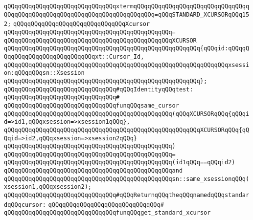 \verb|qQQqqQQqqQQqqQQqqQQqqQQqqQQqqQQqxtermqQQqqQQqqQQqqQQqqQQqqQQqqQQqqQQqqQQqqQQqqQQqqQQqqQQqqQQqqQQqqQQqqQQqqQQqqQQq=qQQqSTANDARD_XCURSORqQQq152;|\newline
\newline
\verb|qQQqqQQqqQQqqQQqqQQqqQQqqQQqqQQqXcursor|\newline
\verb|qQQqqQQqqQQqqQQqqQQqqQQqqQQqqQQqqQQqqQQqqQQqqQQq=|\newline
\verb|qQQqqQQqqQQqqQQqqQQqqQQqqQQqqQQqqQQqqQQqqQQqqQQqXCURSOR|\newline
\verb|qQQqqQQqqQQqqQQqqQQqqQQqqQQqqQQqqQQqqQQqqQQqqQQqqQQqqQQq{qQQqid:qQQqqQQqqQQqqQQqqQQqqQQqqQQqqQQqxt::Cursor_Id,|\newline
\verb|qQQqqQQqqQQqqQQqqQQqqQQqqQQqqQQqqQQqqQQqqQQqqQQqqQQqqQQqqQQqqQQqxsession:qQQqqQQqsn::Xsession|\newline
\verb|qQQqqQQqqQQqqQQqqQQqqQQqqQQqqQQqqQQqqQQqqQQqqQQqqQQqqQQq};|\newline
\newline
\verb|qQQqqQQqqQQqqQQqqQQqqQQqqQQqqQQq#qQQqIdentityqQQqtest:|\newline
\verb|qQQqqQQqqQQqqQQqqQQqqQQqqQQqqQQq#|\newline
\verb|qQQqqQQqqQQqqQQqqQQqqQQqqQQqqQQqfunqQQqsame_cursor|\newline
\verb|qQQqqQQqqQQqqQQqqQQqqQQqqQQqqQQqqQQqqQQqqQQqqQQq(qQQqXCURSORqQQq{qQQqid=>id1,qQQqxsession=>xsession1qQQq},|\newline
\verb|qQQqqQQqqQQqqQQqqQQqqQQqqQQqqQQqqQQqqQQqqQQqqQQqqQQqqQQqXCURSORqQQq{qQQqid=>id2,qQQqxsession=>xsession2qQQq}|\newline
\verb|qQQqqQQqqQQqqQQqqQQqqQQqqQQqqQQqqQQqqQQqqQQqqQQq)|\newline
\verb|qQQqqQQqqQQqqQQqqQQqqQQqqQQqqQQqqQQqqQQqqQQqqQQq=|\newline
\verb|qQQqqQQqqQQqqQQqqQQqqQQqqQQqqQQqqQQqqQQqqQQqqQQq(id1qQQq==qQQqid2)|\newline
\verb|qQQqqQQqqQQqqQQqqQQqqQQqqQQqqQQqqQQqqQQqqQQqqQQqand|\newline
\verb|qQQqqQQqqQQqqQQqqQQqqQQqqQQqqQQqqQQqqQQqqQQqqQQqsn::same_xsessionqQQq(xsession1,qQQqxsession2);|\newline
\newline
\verb|qQQqqQQqqQQqqQQqqQQqqQQqqQQqqQQq#qQQqReturnqQQqtheqQQqnamedqQQqstandardqQQqcursor:|\newline
\verb|qQQqqQQqqQQqqQQqqQQqqQQqqQQqqQQq#|\newline
\verb|qQQqqQQqqQQqqQQqqQQqqQQqqQQqqQQqfunqQQqget_standard_xcursor|\newline
